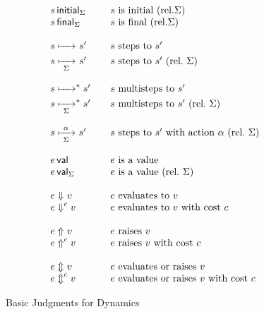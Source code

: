 \documentclass[11pt]{article}
\begin{document}
\begin{figure}[p]
    \begin{displaymath}
        \begin{array}{l@{\qquad}l}
            \iniSt[\Sigma]{s}            & s\ \text{is initial}\ (\text{rel.} \Sigma) \\
            \finSt[\Sigma]{s}            & s\ \text{is final}\ (\text{rel.} \Sigma) \\\\
            s\stepsTo s'         & s\ \text{steps to}\ s' \\
            s\stepsTo[\Sigma] s' & s\ \text{steps to}\ s'\ (\text{rel.}\ \Sigma)\\\\
            s\stepsTo(\ast) s' & s\ \text{multisteps to}\ s' \\
            s\stepsTo[\Sigma](\ast) s' & s\ \text{multisteps to}\ s'\ (\text{rel.}\ \Sigma) \\\\
            s\stepsTo[\Sigma]<\alpha> s' & s\ \text{steps to}\ s'\ \text{with action}\ \alpha\ (\text{rel.}\ \Sigma) \\\\
            \isVal{e}            &  e\ \text{is a value} \\
            \isVal[\Sigma]{e}    & e\ \text{is a value}\ (\text{rel.}\ \Sigma) \\\\
            e\evalsJdg v          & e\ \text{evaluates to}\ v \\
            e\evalsJdg(c) v       & e\ \text{evaluates to}\ v\ \text{with cost}\ c \\\\
            e\raisesJdg v           & e\ \text{raises}\ v \\
            e\raisesJdg(c) v        & e\ \text{raises}\ v\ \text{with cost}\ c \\\\
            e\evalorraiseJdg v    & e\ \text{evaluates or raises}\ v \\
            e\evalorraiseJdg(c) v    & e\ \text{evaluates or raises}\ v\ \text{with cost}\ c
        \end{array}
    \end{displaymath}

    \caption{Basic Judgments for Dynamics}
    \label{fig:dynamics}
\end{figure}
\end{document}
